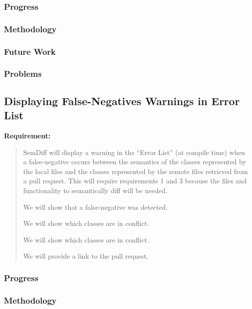 \documentclass[draftclsnofoot,onecolumn]{IEEEtran}
\begin{document}
\subsubsection{Progress}

\subsubsection{Methodology}

\subsubsection{Future Work}

\subsubsection{Problems}






\subsection{Displaying False-Negatives Warnings in Error List}

\textbf{Requirement:}

\begin{quote}

SemDiff will display a warning in the “Error List” (at compile time) when a false-negative occurs between the semantics of the classes represented by the local files and the classes represented by the remote files retrieved from a pull request. This will require requirements 1 and 3 because the files and functionality to semantically diff will be needed.

We will show that a false-negative was detected.

We will show which classes are in conflict.

We will show which classes are in conflict.

We will provide a link to the pull request.

\end{quote}

\subsubsection{Progress}

\subsubsection{Methodology}
\end{document}
